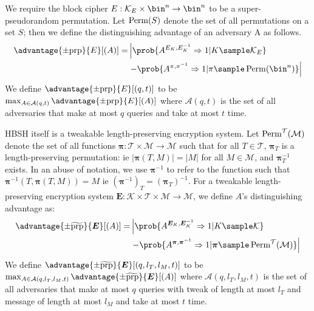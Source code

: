 \documentclass[eprint.tex]{subfiles}
\begin{document}
We require the block cipher $E: \mathcal{K}_E \times \bin^n \rightarrow \bin^n$
to be a super-pseudorandom permutation.
Let $\operatorname{Perm}(S)$ denote the set of all permutations on a set $S$; then we define the distinguishing
advantage of an adversary A as follows.
%
\begin{displaymath}
    \begin{aligned}
        \advantage{\pm \mathrm{prp}}{E}[(A)] =
        &\left|\prob{A^{E_K,E_K^{-1}}\Rightarrow 1 | K \sample \mathcal{K}_E}\right.
        \\
        &\left. - \prob{A^{\pi,\pi^{-1}}\Rightarrow 1
            | \pi \sample \Perm(\bin^n)}\right|
    \end{aligned}
\end{displaymath}
%
We define $\advantage{\pm \mathrm{prp}}{E}[(q, t)]$ to be
$\max_{A \in \mathcal{A}(q, t)} \advantage{\pm \mathrm{prp}}{E}[(A)]$ where $\mathcal{A}(q, t)$
is the set of all adversaries that make at most $q$ queries and take at most $t$ time.

HBSH itself is a tweakable length-preserving encryption system.
Let $\operatorname{Perm}^\mathcal{T}(\mathcal{M})$ denote the set of all functions
$\bm{\pi} : \mathcal{T} \times \mathcal{M} \rightarrow \mathcal{M}$
such that for all $T \in \mathcal{T}$,
$\bm{\pi}_{T}$ is a length-preserving permutation: ie
$|\bm{\pi}(T, M)| = |M|$ for all $M \in \mathcal{M}$,
and $\bm{\pi}_{T}^{-1}$ exists.
In an abuse of notation, we use $\bm{\pi}^{-1}$ to refer to the function
such that $\bm{\pi}^{-1}(T, \bm{\pi}(T, M)) = M$ ie $(\bm{\pi}^{-1})_T = (\bm{\pi}_T)^{-1}$.
For a tweakable length-preserving encryption system
$\bm{E} : \mathcal{K} \times \mathcal{T} \times \mathcal{M} \rightarrow \mathcal{M}$, we
define $A$'s distinguishing advantage as:
%
\begin{displaymath}
    \begin{aligned}
        \advantage{\pm \widetilde{\mathrm{prp}}}{\bm{E}}[(A)] =
        &\left|\prob{A^{\bm{E}_K,\bm{E}_K^{-1}}\Rightarrow 1 | K \sample \mathcal{K}}\right.
        \\
        &\left. - \prob{A^{\bm{\pi},\bm{\pi}^{-1}}\Rightarrow 1
            | \bm{\pi} \sample \Perm^\mathcal{T}(\mathcal{M})}\right|
    \end{aligned}
\end{displaymath}
%
We define $\advantage{\pm \widetilde{\mathrm{prp}}}{\bm{E}}[(q, l_T, l_M, t)]$
to be
$\max_{A \in \mathcal{A}(q, l_T, l_M, t)} \advantage{\pm \widetilde{\mathrm{prp}}}{\bm{E}}[(A)]$
where $\mathcal{A}(q, l_T, l_M, t)$
is the set of all adversaries that
make at most $q$ queries
with tweak of length at most $l_T$
and message of length at most $l_M$
and take at most $t$ time.
\end{document}
